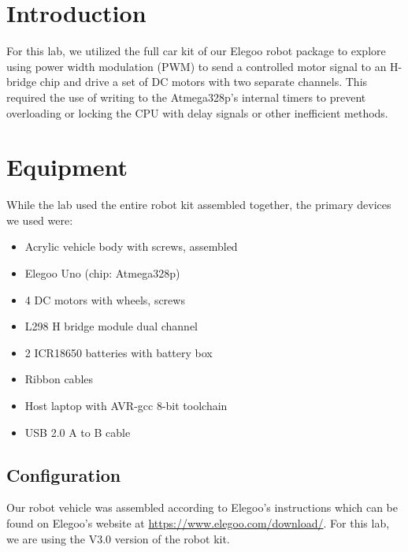 \documentclass[letterpaper,11pt]{texMemo} %
\begin{document}
\maketitle %


\section*{Introduction}
For this lab, we utilized the full car kit of our Elegoo robot package to 
explore using power width modulation (PWM) to send a controlled motor signal to an H-bridge chip
and drive a set of DC motors with two separate channels. This required the
use of writing to the Atmega328p's internal timers to prevent overloading or locking
the CPU with delay signals or other inefficient methods.

\section*{Equipment}
While the lab used the entire robot kit assembled together, the primary devices
we used were:

\begin{itemize}
    \item Acrylic vehicle body with screws, assembled
    \item Elegoo Uno (chip: Atmega328p)
    \item 4 DC motors with wheels, screws 
    \item L298 H bridge module dual channel
    \item 2 ICR18650 batteries with battery box
    \item Ribbon cables
    \item Host laptop with AVR-gcc 8-bit toolchain
    \item USB 2.0 A to B cable
\end{itemize}

\subsection*{Configuration}
Our robot vehicle was assembled according to Elegoo's instructions which can be found
on Elegoo's website at \url{https://www.elegoo.com/download/}. For this lab, we are
using the V3.0 version of the robot kit.
\end{document}

